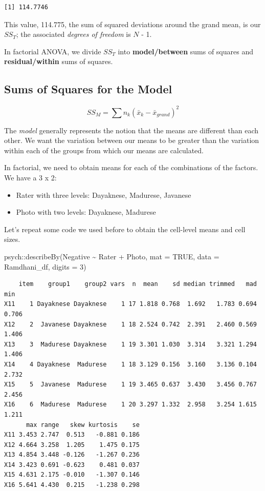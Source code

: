 \documentclass[
  11pt,
]{book}
\newenvironment{Shaded}{\begin{snugshade}}{\end{snugshade}}
\newcommand{\AttributeTok}[1]{\textcolor[rgb]{0.77,0.63,0.00}{#1}}
\newcommand{\ConstantTok}[1]{\textcolor[rgb]{0.00,0.00,0.00}{#1}}
\newcommand{\DecValTok}[1]{\textcolor[rgb]{0.00,0.00,0.81}{#1}}
\newcommand{\FunctionTok}[1]{\textcolor[rgb]{0.00,0.00,0.00}{#1}}
\newcommand{\NormalTok}[1]{#1}
\newcommand{\SpecialCharTok}[1]{\textcolor[rgb]{0.00,0.00,0.00}{#1}}
\providecommand{\tightlist}{%
  \setlength{\itemsep}{0pt}\setlength{\parskip}{0pt}}
\begin{document}
\begin{verbatim}
[1] 114.7746
\end{verbatim}

This value, 114.775, the sum of squared deviations around the grand mean, is our \(SS_T\); the associated \emph{degrees of freedom} is \(N\) - 1.

In factorial ANOVA, we divide \(SS_T\) into \textbf{model/between} sums of squares and \textbf{residual/within} sums of squares.

\hypertarget{sums-of-squares-for-the-model}{%
\subsection{Sums of Squares for the Model}\label{sums-of-squares-for-the-model}}

\[SS_{M}= \sum n_{k}(\bar{x}_{k}-\bar{x}_{grand})^{2}\]

The \emph{model} generally represents the notion that the means are different than each other. We want the variation between our means to be greater than the variation within each of the groups from which our means are calculated.

In factorial, we need to obtain means for each of the combinations of the factors. We have a 3 x 2:

\begin{itemize}
\tightlist
\item
  Rater with three levels: Dayaknese, Madurese, Javanese
\item
  Photo with two levels: Dayaknese, Madurese
\end{itemize}

Let's repeat some code we used before to obtain the cell-level means and cell sizes.

\begin{Shaded}
\begin{Highlighting}[]
\NormalTok{psych}\SpecialCharTok{::}\FunctionTok{describeBy}\NormalTok{(Negative }\SpecialCharTok{\textasciitilde{}}\NormalTok{ Rater }\SpecialCharTok{+}\NormalTok{ Photo, }\AttributeTok{mat =} \ConstantTok{TRUE}\NormalTok{, }\AttributeTok{data =}\NormalTok{ Ramdhani\_df,}
    \AttributeTok{digits =} \DecValTok{3}\NormalTok{)}
\end{Highlighting}
\end{Shaded}

\begin{verbatim}
    item    group1    group2 vars  n  mean    sd median trimmed   mad   min
X11    1 Dayaknese Dayaknese    1 17 1.818 0.768  1.692   1.783 0.694 0.706
X12    2  Javanese Dayaknese    1 18 2.524 0.742  2.391   2.460 0.569 1.406
X13    3  Madurese Dayaknese    1 19 3.301 1.030  3.314   3.321 1.294 1.406
X14    4 Dayaknese  Madurese    1 18 3.129 0.156  3.160   3.136 0.104 2.732
X15    5  Javanese  Madurese    1 19 3.465 0.637  3.430   3.456 0.767 2.456
X16    6  Madurese  Madurese    1 20 3.297 1.332  2.958   3.254 1.615 1.211
      max range   skew kurtosis    se
X11 3.453 2.747  0.513   -0.881 0.186
X12 4.664 3.258  1.205    1.475 0.175
X13 4.854 3.448 -0.126   -1.267 0.236
X14 3.423 0.691 -0.623    0.481 0.037
X15 4.631 2.175 -0.010   -1.307 0.146
X16 5.641 4.430  0.215   -1.238 0.298
\end{verbatim}
\end{document}
